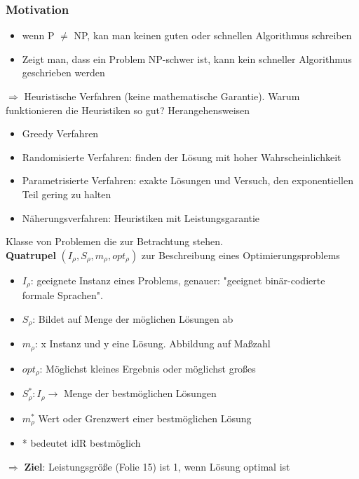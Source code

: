 \documentclass[ngerman]{scrartcl}
\begin{document}
\subsubsection{Motivation}
\begin{itemize}
  \item wenn P $ \neq $ NP, kan man keinen guten oder schnellen Algorithmus schreiben
  \item Zeigt man, dass ein Problem NP-schwer ist, kann kein schneller Algorithmus geschrieben werden  
\end{itemize}
$\Rightarrow$ Heuristische Verfahren (keine mathematische Garantie). Warum funktionieren die Heuristiken so gut?
Herangehensweisen
\begin{itemize}
  \item Greedy Verfahren
  \item Randomisierte Verfahren: finden der Lösung mit hoher Wahrscheinlichkeit
  \item Parametrisierte Verfahren: exakte Lösungen und Versuch, den exponentiellen Teil gering zu halten
  \item Näherungsverfahren: Heuristiken mit Leistungsgarantie
\end{itemize}
Klasse von Problemen die zur Betrachtung stehen. \\
\textbf{Quatrupel} $ (I_\rho, S_\rho, m_\rho , opt_\rho) $ zur Beschreibung eines Optimierungsproblems
\begin{itemize}
  \item $ I_\rho $: geeignete Instanz eines Problems, genauer: "geeignet binär-codierte formale Sprachen".
  \item $ S_\rho $: Bildet auf Menge der möglichen Lösungen ab
  \item $ m_\rho $: x Instanz und y eine Lösung. Abbildung auf Maßzahl
  \item $ opt_\rho $: Möglichst kleines Ergebnis oder möglichst großes
\end{itemize}
\begin{itemize}
  \item $ S_\rho^*: I_\rho \rightarrow $ Menge der bestmöglichen Lösungen
  \item $ m_\rho^* $ Wert oder Grenzwert einer bestmöglichen Lösung
  \item * bedeutet idR bestmöglich
\end{itemize}
$\Rightarrow$ \textbf{Ziel}: Leistungsgröße (Folie 15) ist 1, wenn Lösung optimal ist
\end{document}
